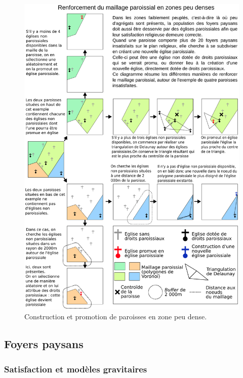 	\begin{figure}[H]
		\centering
		\includegraphics[width=1\linewidth]{img/constru-promo_paroisses_rurales.pdf}
		\caption{Construction et promotion de paroisses en zone peu dense.}
		\label{fig:promotion-paroisses}
	\end{figure}
	
\clearpage
\subsection{Foyers paysans}

	\subsubsection{Satisfaction et modèles gravitaires \label{sssec:satisfaction}}
	
